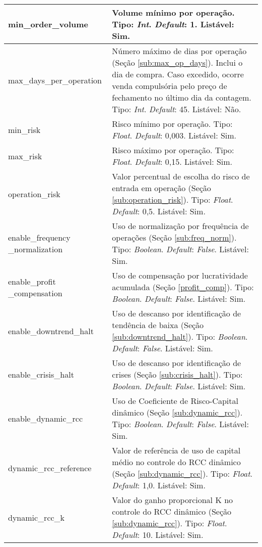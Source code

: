 \begin{center}
{\begin{longtable}[m]{| m{11em} | m{21em} |}
        \hline
        min\_order\_volume & Volume mínimo por operação. Tipo: \textit{Int}. \textit{Default}: 1. Listável: Sim. \\
        \hline
        max\_days\_per\_operation & Número máximo de dias por operação (Seção \ref{sub:max_op_days}). Inclui o dia de compra. Caso excedido, ocorre venda compulsória pelo preço de fechamento no último dia da contagem. Tipo: \textit{Int}. \textit{Default}: 45. Listável: Não. \\
        \hline
        min\_risk & Risco mínimo por operação. Tipo: \textit{Float}. \textit{Default}: 0,003. Listável: Sim. \\
        \hline
        max\_risk & Risco máximo por operação. Tipo: \textit{Float}. \textit{Default}: 0,15. Listável: Sim. \\
        \hline
        operation\_risk & Valor percentual de escolha do risco de entrada em operação (Seção \ref{sub:operation_risk}). Tipo: \textit{Float}. \textit{Default}: 0,5. Listável: Sim. \\
        \hline
        enable\_frequency\hspace{2em} \_normalization & Uso de normalização por frequência de operações (Seção \ref{sub:freq_norm}). Tipo: \textit{Boolean}. \textit{Default}: \textit{False}. Listável: Sim. \\
        \hline
        enable\_profit\hspace{4em} \_compensation & Uso de compensação por lucratividade acumulada (Seção \ref{profit_comp}). Tipo: \textit{Boolean}. \textit{Default}: \textit{False}. Listável: Sim. \\
        \hline
        enable\_downtrend\_halt & Uso de descanso por identificação de tendência de baixa (Seção \ref{sub:downtrend_halt}). Tipo: \textit{Boolean}. \textit{Default}: \textit{False}. Listável: Sim. \\
        \hline
        enable\_crisis\_halt & Uso de descanso por identificação de crises (Seção \ref{sub:crisis_halt}). Tipo: \textit{Boolean}. \textit{Default}: \textit{False}. Listável: Sim. \\
        \hline
        enable\_dynamic\_rcc & Uso de Coeficiente de Risco-Capital dinâmico (Seção \ref{sub:dynamic_rcc}). Tipo: \textit{Boolean}. \textit{Default}: \textit{False}. Listável: Sim. \\
        \hline
        dynamic\_rcc\_reference & Valor de referência de uso de capital médio no controle do RCC dinâmico (Seção \ref{sub:dynamic_rcc}). Tipo: \textit{Float}. \textit{Default}: 1,0. Listável: Sim. \\
        \hline
        dynamic\_rcc\_k & Valor do ganho proporcional K no controle do RCC dinâmico (Seção \ref{sub:dynamic_rcc}). Tipo: \textit{Float}. \textit{Default}: 10. Listável: Sim. \\
        \hline


\end{longtable}}
\end{center}
